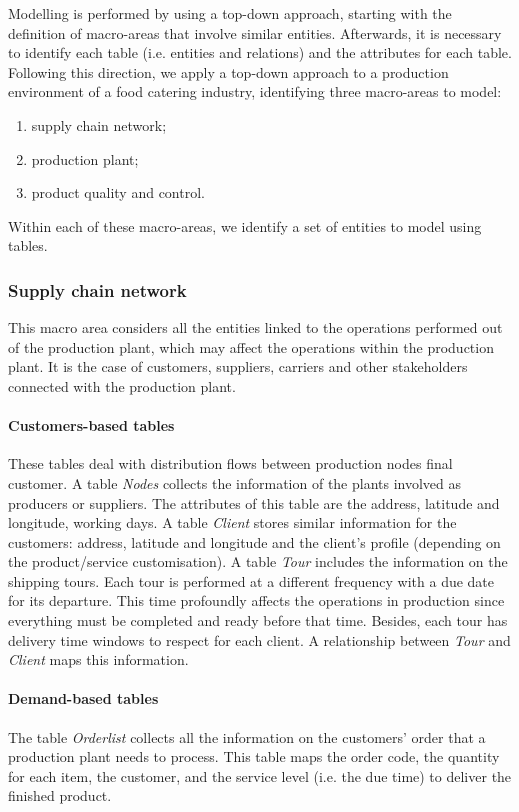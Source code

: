 Modelling is performed by using a top-down approach, starting with the definition of macro-areas that involve similar entities. Afterwards, it is necessary to identify each table (i.e. entities and relations) and the attributes for each table. Following this direction, we apply a top-down approach to a production environment of a food catering industry, identifying three macro-areas to model:

\begin{enumerate}
    \item supply chain network;
    \item production plant;
    \item product quality and control.
\end{enumerate}

Within each of these macro-areas, we identify a set of entities to model using tables.

\subsubsection{Supply chain network}
This macro area considers all the entities linked to the operations performed out of the production plant, which may affect the operations within the production plant. It is the case of customers, suppliers, carriers and other stakeholders connected with the production plant.

\paragraph{Customers-based tables}
These tables deal with distribution flows between production nodes final customer. A table \textit{Nodes} collects the information of the plants involved as producers or suppliers. The attributes of this table are the address, latitude and longitude, working days.  A table \textit{Client} stores similar information for the customers: address, latitude and longitude and the client’s profile (depending on the product/service customisation). A table \textit{Tour} includes the information on the shipping tours. Each tour is performed at a different frequency with a due date for its departure. This time profoundly affects the operations in production since everything must be completed and ready before that time. Besides, each tour has delivery time windows to respect for each client. A relationship between \textit{Tour} and \textit{Client} maps this information.

\paragraph{Demand-based tables}
The table \textit{Orderlist} collects all the information on the customers' order that a production plant needs to process. This table maps the order code, the quantity for each item, the customer, and the service level (i.e. the due time) to deliver the finished product.

